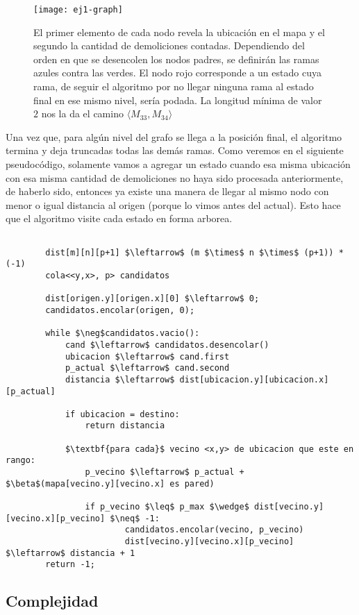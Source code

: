     \begin{figure}[H]
        \centering
        \texttt{[image: ej1-graph]}
        \caption{El primer elemento de cada nodo revela la ubicación en el mapa y el segundo la cantidad de demoliciones contadas. Dependiendo del orden en que se desencolen los nodos padres, se definirán las ramas azules contra las verdes. El nodo rojo corresponde a un estado cuya rama, de seguir el algoritmo por no llegar ninguna rama al estado final en ese mismo nivel, sería podada. La longitud mínima de valor $2$ nos la da el camino $\langle {M_{33}, M_{34}} \rangle$}
        \label{fig:ej1-graph}
    \end{figure}

Una vez que, para algún nivel del grafo se llega a la posición final, el algoritmo termina y deja truncadas todas las demás ramas. Como veremos en el siguiente pseudocódigo, solamente vamos a agregar un estado cuando esa misma ubicación con esa misma cantidad de demoliciones no haya sido procesada anteriormente, de haberlo sido, entonces ya existe una manera de llegar al mismo nodo con menor o igual distancia al origen (porque lo vimos antes del actual). Esto hace que el algoritmo visite cada estado en forma arborea.

    \begin{lstlisting}

        dist[m][n][p+1] $\leftarrow$ (m $\times$ n $\times$ (p+1)) * (-1)
        cola<<y,x>, p> candidatos

        dist[origen.y][origen.x][0] $\leftarrow$ 0;
        candidatos.encolar(origen, 0);

        while $\neg$candidatos.vacio():
            cand $\leftarrow$ candidatos.desencolar()
            ubicacion $\leftarrow$ cand.first
            p_actual $\leftarrow$ cand.second
            distancia $\leftarrow$ dist[ubicacion.y][ubicacion.x][p_actual]

            if ubicacion = destino:
                return distancia

            $\textbf{para cada}$ vecino <x,y> de ubicacion que este en rango:
                p_vecino $\leftarrow$ p_actual + $\beta$(mapa[vecino.y][vecino.x] es pared)

                if p_vecino $\leq$ p_max $\wedge$ dist[vecino.y][vecino.x][p_vecino] $\neq$ -1:
                        candidatos.encolar(vecino, p_vecino)
                        dist[vecino.y][vecino.x][p_vecino] $\leftarrow$ distancia + 1
        return -1;

    \end{lstlisting}


\subsection{Complejidad}
